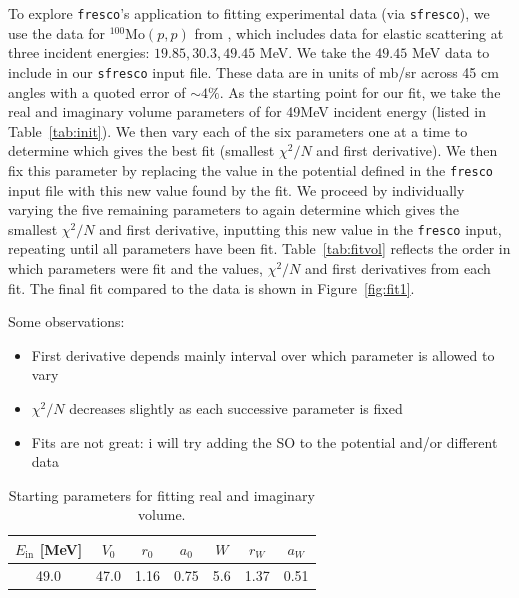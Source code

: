 \documentclass[]{scrartcl}
\begin{document}
To explore \texttt{fresco}'s application to fitting experimental data (via \texttt{sfresco}), we use the data for $ ^{100} \mathrm{Mo} (p,p)$ from \citep{Sinha1972}, which includes data for elastic scattering at three incident energies: $19.85,30.3,49.45$ MeV. We take the $49.45$ MeV data to include in our \texttt{sfresco} input file. These data are in units of mb/sr across 45 cm angles with a quoted error of $\sim 4 \%$. As the starting point for our fit, we take the real and imaginary volume parameters of \citep{Menet1971} for 49MeV incident energy (listed in Table~\ref{tab:init}). We then vary each of the six parameters one at a time to determine which gives the best fit (smallest $\chi ^2 / N$ and first derivative). We then fix this parameter by replacing the value in the potential defined in the \texttt{fresco} input file with this new value found by the fit. We proceed by individually varying the five remaining parameters to again determine which gives the smallest $\chi ^2 / N$ and first derivative, inputting this new value in the \texttt{fresco} input, repeating until all parameters have been fit. Table~\ref{tab:fitvol} reflects the order in which parameters were fit and the values, $\chi ^2 / N$ and first derivatives from each fit. The final fit compared to the data is shown in Figure~\ref{fig:fit1}.

Some observations:
\begin{itemize}
	\item First derivative depends mainly interval over which parameter is allowed to vary
	\item $\chi ^2 / N$ decreases slightly as each successive parameter is fixed
	\item Fits are not great: i will try adding the SO to the potential and/or different data
\end{itemize}

\begin{table}
\centering
	\begin{tabular}{ c | c c c | c c c  }
	$E _{\mathrm{in}}$ [MeV] & $ V _0$ & $ r _0$ & $ a _0$ & $W$ & $ r _{W} $ & $ a _{W} $\\
\hline
	49.0 &  47.0 &  1.16 &  0.75  &  5.6 & 1.37 &  0.51\\
\hline
	\end{tabular}
	\caption{Starting parameters for fitting real and imaginary volume.}
	\label{tab:initvol}
\end{table}
\end{document}
